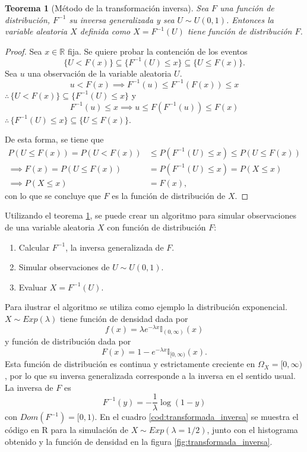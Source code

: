\documentclass[11pt,a4paper]{article}
\newtheorem{theorem}{Teorema}[section]
\begin{document}
\begin{theorem}[Método de la transformación inversa] \label{teo:trans}
Sea $F$ una función de distribución, $F^{-1}$ su inversa generalizada y sea $U\sim U(0,1)$. Entonces la variable aleatoria $X$ definida como $X = F^{-1}(U)$ tiene función de distribución $F$.
\end{theorem}
\begin{proof}
Sea $x\in \mathbb{R}$ fija. Se quiere probar la contención de los eventos $$\{U<F(x)\}\subseteq\{F^{-1}(U)\leq x\}\subseteq\{U\leq F(x)\}.$$ Sea $u$ una observación de la variable aleatoria $U$.
$$u<F(x) \implies F^{-1}(u) \leq F^{-1}(F(x)) \leq x$$
$\therefore \hspace{2pt} \{U<F(x)\} \subseteq\{F^{-1}(U)\leq x\}$ y
$$F^{-1}(u)\leq x \implies u\leq F(F^{-1}(u))\leq F(x)$$
$\therefore \hspace{2pt} \{F^{-1}(U)\leq x\}\subseteq \{U \leq F(x)\}$.

De esta forma, se tiene que 
\begin{align*}
P\left(U\leq F(x)\right) = P\left(U<F(x)\right) &\leq P\left(F^{-1}(U)\leq x\right) \leq P\left(U \leq F(x)\right)\\
\implies F(x) = P\left(U \leq F(x)\right) &= P\left(F^{-1}(U)\leq x\right) = P\left(X\leq x\right)\\
\implies P\left(X \leq x\right) &= F(x),
\end{align*}
con lo que se concluye que $F$ es la función de distribución de $X$.
\end{proof}

Utilizando el teorema \ref{teo:trans}, se puede crear un algoritmo para simular observaciones de una variable aleatoria $X$ con función de distribución $F$:
\begin{enumerate}
\item Calcular $F^{-1}$, la inversa generalizada de $F$.
\item Simular observaciones de $U\sim U(0,1)$.
\item Evaluar $X=F^{-1}(U)$.
\end{enumerate}

Para ilustrar el algoritmo se utiliza como ejemplo la distribución exponencial. $X\sim Exp(\lambda)$ tiene función de densidad dada por $$f(x) = \lambda e^{-\lambda x} \mathbb{I}_{(0,\infty)}(x)$$ y función de distribución dada por $$F(x) = 1-e^{-\lambda x}\mathbb{I}_{[0,\infty)}(x).$$ Esta función de distribución es continua y estrictamente creciente en $\Omega_X=[0, \infty)$, por lo que su inversa generalizada corresponde a la inversa en el sentido usual. La inversa de $F$ es $$F^{-1}(y) = -\frac{1}{\lambda}\log (1-y)$$ con $Dom(F^{-1}) = [0, 1)$. En el cuadro \ref{cod:transformada_inversa} se muestra el código en R para la simulación de $X \sim Exp(\lambda = 1/2)$, junto con el histograma obtenido y la función de densidad en la figura \ref{fig:transformada_inversa}.
\end{document}
